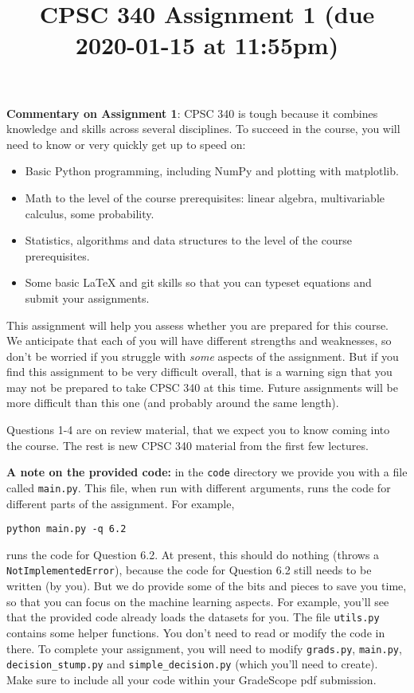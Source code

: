 \documentclass{article}
\begin{document}
\title{CPSC 340 Assignment 1 (due 2020-01-15 at 11:55pm)}

\date{}
\maketitle


\vspace{-4em}

\textbf{Commentary on Assignment 1}: CPSC 340 is tough because it combines knowledge and skills across several disciplines. To succeed
in the course, you will need to know or very quickly get up to speed on:
\begin{itemize}
\item Basic Python programming, including NumPy and plotting with matplotlib.
\item Math to the level of the course prerequisites: linear algebra, multivariable calculus, some probability.
\item Statistics, algorithms and data structures to the level of the course prerequisites.
\item Some basic LaTeX and git skills so that you can typeset equations and submit your assignments.
\end{itemize}
  
This assignment will help you assess whether you are prepared for this course. We anticipate that each
of you will have different strengths and weaknesses, so don't be worried if you struggle with \emph{some} aspects
of the assignment. But if you find this assignment
to be very difficult overall, that is a warning sign that you may not be prepared to take CPSC 340
at this time. Future assignments will be more difficult than this one (and probably around the same length).

Questions 1-4 are on review material, that we expect you to know coming into the course. The rest is new CPSC 340 material from the first few lectures.

\textbf{A note on the provided code:} in the \texttt{code} directory we provide you with a file called
\texttt{main.py}. This file, when run with different arguments, runs the code for different
parts of the assignment. For example,
\begin{verbatim}
python main.py -q 6.2
\end{verbatim}
runs the code for Question 6.2. At present, this should do nothing (throws a \texttt{NotImplementedError}), because the code
for Question 6.2 still needs to be written (by you). But we do provide some of the bits
and pieces to save you time, so that you can focus on the machine learning aspects.
For example, you'll see that the provided code already loads the datasets for you.
The file \texttt{utils.py} contains some helper functions.
You don't need to read or modify the code in there.
To complete your assignment, you will need to modify \texttt{grads.py}, \texttt{main.py}, \texttt{decision\string_stump.py} and \texttt{simple\string_decision.py} (which you'll need to create). Make sure to include all your code within your GradeScope pdf submission.
\end{document}
